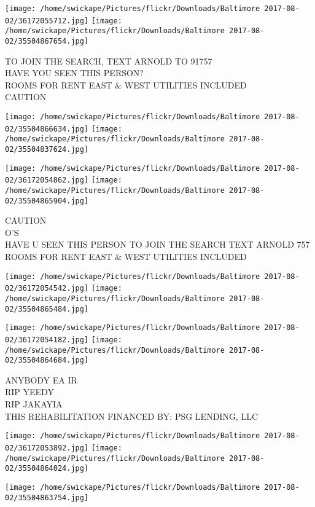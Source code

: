 \documentclass[10pt,letterpaper]{article}
\begin{document}
\texttt{[image: /home/swickape/Pictures/flickr/Downloads/Baltimore 2017-08-02/36172055712.jpg]}
\texttt{[image: /home/swickape/Pictures/flickr/Downloads/Baltimore 2017-08-02/35504867654.jpg]}

TO JOIN THE SEARCH, TEXT ARNOLD TO 91757\\
HAVE YOU SEEN THIS PERSON?\\
ROOMS FOR RENT EAST \& WEST UTILITIES INCLUDED\\
CAUTION\\
\pagebreak

\texttt{[image: /home/swickape/Pictures/flickr/Downloads/Baltimore 2017-08-02/35504866634.jpg]}
\texttt{[image: /home/swickape/Pictures/flickr/Downloads/Baltimore 2017-08-02/35504837624.jpg]}

\texttt{[image: /home/swickape/Pictures/flickr/Downloads/Baltimore 2017-08-02/36172054862.jpg]}
\texttt{[image: /home/swickape/Pictures/flickr/Downloads/Baltimore 2017-08-02/35504865904.jpg]}

CAUTION\\
O'S\\
HAVE U SEEN THIS PERSON TO JOIN THE SEARCH TEXT ARNOLD 757\\
ROOMS FOR RENT EAST \& WEST UTILITIES INCLUDED\\
\pagebreak

\texttt{[image: /home/swickape/Pictures/flickr/Downloads/Baltimore 2017-08-02/36172054542.jpg]}
\texttt{[image: /home/swickape/Pictures/flickr/Downloads/Baltimore 2017-08-02/35504865484.jpg]}

\texttt{[image: /home/swickape/Pictures/flickr/Downloads/Baltimore 2017-08-02/36172054182.jpg]}
\texttt{[image: /home/swickape/Pictures/flickr/Downloads/Baltimore 2017-08-02/35504864684.jpg]}

ANYBODY EA IR\\
RIP YEEDY\\
RIP JAKAYIA\\
THIS REHABILITATION FINANCED BY: PSG LENDING, LLC\\
\pagebreak

\texttt{[image: /home/swickape/Pictures/flickr/Downloads/Baltimore 2017-08-02/36172053892.jpg]}
\texttt{[image: /home/swickape/Pictures/flickr/Downloads/Baltimore 2017-08-02/35504864024.jpg]}

\vspace{0.25in}
\texttt{[image: /home/swickape/Pictures/flickr/Downloads/Baltimore 2017-08-02/35504863754.jpg]}
\end{document}
